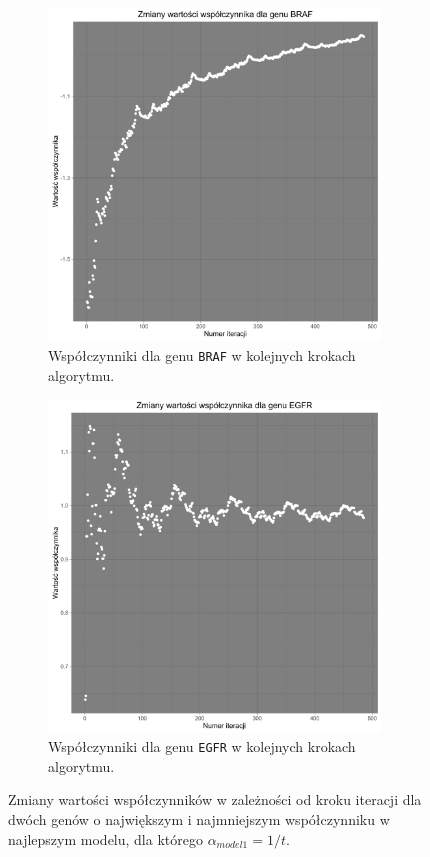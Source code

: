 \begin{figure}[hbt!]
  \begin{center}
   \begin{subfigure}[h!]{0.45\textwidth}
      \includegraphics[width=\textwidth, height=250pt]{Obrazki/analiza/BRAF.pdf}
      \caption{Współczynniki dla genu \texttt{BRAF} w kolejnych krokach algorytmu.}
   \end{subfigure}     
   \begin{subfigure}[h!]{0.45\textwidth}
      \includegraphics[width=\textwidth, height=250pt]{Obrazki/analiza/EGFR.pdf}
            \caption{Współczynniki dla genu \texttt{EGFR} w kolejnych krokach algorytmu.}
   \end{subfigure}  
      \end{center}
  \caption{\label{trajAnalisis} Zmiany wartości współczynników w zależności od kroku iteracji dla dwóch genów o największym i najmniejszym współczynniku w najlepszym modelu, dla którego $\alpha_{model1} = 1/t$.}
\end{figure}





